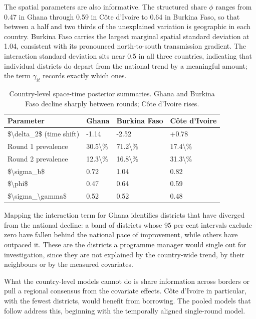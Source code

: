 \documentclass{article}
\begin{document}
The spatial parameters are also informative. The structured share
\(\phi\) ranges from 0.47 in Ghana through 0.59 in Côte d'Ivoire to 0.64
in Burkina Faso, so that between a half and two thirds of the
unexplained variation is geographic in each country. Burkina Faso
carries the largest marginal spatial standard deviation at 1.04,
consistent with its pronounced north-to-south transmission gradient. The
interaction standard deviation sits near 0.5 in all three countries,
indicating that individual districts do depart from the national trend
by a meaningful amount; the term \(\gamma_{it}\) records exactly which
ones.

\begin{longtable}[t]{llll}
\caption{\label{tab:m2}\label{tab:m2}Country-level space-time posterior summaries. Ghana and Burkina Faso decline sharply between rounds; Côte d'Ivoire rises.}\\
\toprule
Parameter & Ghana & Burkina Faso & Côte d'Ivoire\\
\midrule
\$\textbackslash{}delta\_2\$ (time shift) & -1.14 & -2.52 & +0.78\\
Round 1 prevalence & 30.5\textbackslash{}\% & 71.2\textbackslash{}\% & 17.4\textbackslash{}\%\\
Round 2 prevalence & 12.3\textbackslash{}\% & 16.8\textbackslash{}\% & 31.3\textbackslash{}\%\\
\$\textbackslash{}sigma\_b\$ & 0.72 & 1.04 & 0.82\\
\$\textbackslash{}phi\$ & 0.47 & 0.64 & 0.59\\
\addlinespace
\$\textbackslash{}sigma\_\textbackslash{}gamma\$ & 0.52 & 0.52 & 0.48\\
\bottomrule
\end{longtable}

Mapping the interaction term for Ghana identifies districts that have
diverged from the national decline: a band of districts whose 95 per
cent intervals exclude zero have fallen behind the national pace of
improvement, while others have outpaced it. These are the districts a
programme manager would single out for investigation, since they are not
explained by the country-wide trend, by their neighbours or by the
measured covariates.

What the country-level models cannot do is share information across
borders or pull a regional consensus from the covariate effects. Côte
d'Ivoire in particular, with the fewest districts, would benefit from
borrowing. The pooled models that follow address this, beginning with
the temporally aligned single-round model.
\end{document}
